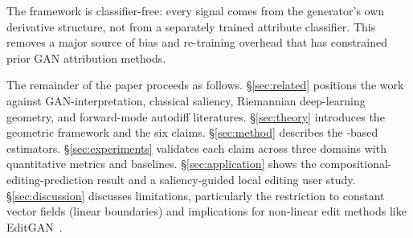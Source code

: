 The framework is classifier-free: every signal comes from the
generator's own derivative structure, not from a separately trained
attribute classifier. This removes a major source of bias and
re-training overhead that has constrained prior GAN attribution
methods.

The remainder of the paper proceeds as follows.
\S\ref{sec:related} positions the work against
GAN-interpretation, classical saliency, Riemannian deep-learning
geometry, and forward-mode autodiff literatures.
\S\ref{sec:theory} introduces the geometric framework and the six
claims.
\S\ref{sec:method} describes the \jvp-based estimators.
\S\ref{sec:experiments} validates each claim across three domains
with quantitative metrics and baselines.
\S\ref{sec:application} shows the compositional-editing-prediction
result and a saliency-guided local editing user study.
\S\ref{sec:discussion} discusses limitations, particularly the
restriction to constant vector fields (linear boundaries) and
implications for non-linear edit methods like
EditGAN~\cite{Ling2021EditGAN}.
